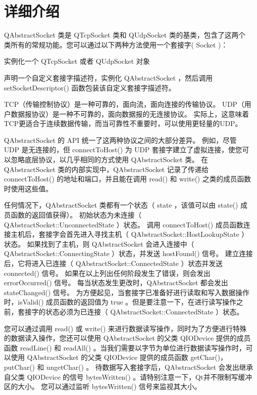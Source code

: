 \section{详细介绍}

QAbstractSocket 类是 QTcpSocket 类和 QUdpSocket 类的基类，包含了这两个
类所有的常规功能。您可以通过以下两种方法使用一个套接字( Socket )：

\begin{compactitem}[\arr]
\item 实例化一个 QTcpSocket 或者 QUdpSocket 对象
\item 声明一个自定义套接字描述符，实例化 QAbstractSocket ，然后调用 setSocketDescriptor() 函数包装该自定义套接字描述符。
\end{compactitem}

TCP（传输控制协议）是一种可靠的，面向流，面向连接的传输协议。 UDP（用户数据报协议）是一种不可靠的，面向数据报的无连接协议。 实际上，这意味着TCP更适合于连续数据传输，而当可靠性不重要时，可以使用更轻量的UDP。

QAbstractSocket 的 API 统一了这两种协议之间的大部分差异。 例如，尽管 UDP 是无连接的，但 connectToHost() 为 UDP 套接字建立了虚拟连接，使您可以忽略底层协议，以几乎相同的方式使用 QAbstractSocket 类。 在 QAbstractSocket 类的内部实现中，QAbstractSocket 记录了传递给 connectToHost() 的地址和端口，并且能在调用 read() 和 write() 之类的成员函数时使用这些值。

任何情况下，QAbstractSocket 类都有一个状态（ state ，该值可以由 state() 成员函数的返回值获得）。 初始状态为未连接（ QAbstractSocket::UnconnectedState ）状态。 调用 connectToHost() 成员函数连接主机后，套接字会首先进入寻找主机（ QAbstractSocket::HostLookupState ）状态。 如果找到了主机，则 QAbstractSocket 会进入连接中（ QAbstractSocket::ConnectingState ）状态，并发送 hostFound() 信号。 建立连接后，它将进入已连接（ QAbstractSocket::ConnectedState ）状态并发送 connected() 信号。 如果在以上列出任何阶段发生了错误，则会发出 errorOccurred() 信号。 每当状态发生更改时，QAbstractSocket 都会发出 stateChanged() 信号。 为方便起见，当套接字已准备好进行读取和写入数据操作时，isValid() 成员函数的返回值为 true 。但是要注意一下，在进行读写操作之前，套接字的状态必须为已连接（ QAbstractSocket::ConnectedState ）状态。

您可以通过调用 read() 或 write() 来进行数据读写操作，同时为了方便进行特殊的数据读入操作，您还可以使用 QAbstractSocket 的父类 QIODevice 提供的成员函数 readLine() 和 readAll() 。当我们需要以字节为单位进行数据读写操作时，可以使用 QAbstractSocket 的父类 QIODevice 提供的成员函数 getChar()，putChar() 和 ungetChar() 。 待数据写入套接字后，QAbstractSocket 会发出继承自父类 QIODevice 的信号 bytesWritten() 。请特别注意一下，Qt并不限制写缓冲区的大小。 您可以通过监听 bytesWritten() 信号来监视其大小。

